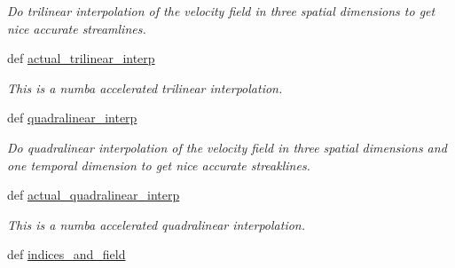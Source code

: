 \begin{DoxyCompactItemize}
\begin{DoxyCompactList}\small\item\em Do trilinear interpolation of the velocity field in three spatial dimensions to get nice accurate streamlines. \end{DoxyCompactList}\item 
def \hyperlink{namespacemitgcm_1_1streamlines_a3577f2724420caf7e275c3d9ad3a4a03}{actual\+\_\+trilinear\+\_\+interp}
\begin{DoxyCompactList}\small\item\em This is a numba accelerated trilinear interpolation. \end{DoxyCompactList}\item 
def \hyperlink{namespacemitgcm_1_1streamlines_a2b3460327fd28541672b6ad5c1ba903f}{quadralinear\+\_\+interp}
\begin{DoxyCompactList}\small\item\em Do quadralinear interpolation of the velocity field in three spatial dimensions and one temporal dimension to get nice accurate streaklines. \end{DoxyCompactList}\item 
def \hyperlink{namespacemitgcm_1_1streamlines_a80949f29827013f60f0808d4b531953c}{actual\+\_\+quadralinear\+\_\+interp}
\begin{DoxyCompactList}\small\item\em This is a numba accelerated quadralinear interpolation. \end{DoxyCompactList}\item 
def \hyperlink{namespacemitgcm_1_1streamlines_ab0999e36574643a8ab149aef0fe3b283}{indices\+\_\+and\+\_\+field}
\end{DoxyCompactItemize}


